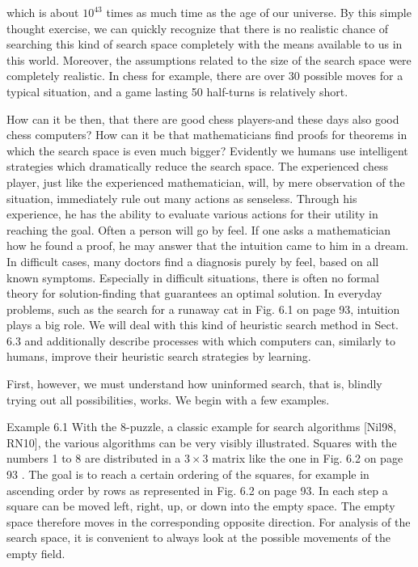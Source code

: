 \documentclass[10pt]{article}
\begin{document}
which is about $10^{43}$ times as much time as the age of our universe. By this simple thought exercise, we can quickly recognize that there is no realistic chance of searching this kind of search space completely with the means available to us in this world. Moreover, the assumptions related to the size of the search space were completely realistic. In chess for example, there are over 30 possible moves for a typical situation, and a game lasting 50 half-turns is relatively short.

How can it be then, that there are good chess players-and these days also good chess computers? How can it be that mathematicians find proofs for theorems in which the search space is even much bigger? Evidently we humans use intelligent strategies which dramatically reduce the search space. The experienced chess player, just like the experienced mathematician, will, by mere observation of the situation, immediately rule out many actions as senseless. Through his experience, he has the ability to evaluate various actions for their utility in reaching the goal. Often a person will go by feel. If one asks a mathematician how he found a proof, he may answer that the intuition came to him in a dream. In difficult cases, many doctors find a diagnosis purely by feel, based on all known symptoms. Especially in difficult situations, there is often no formal theory for solution-finding that guarantees an optimal solution. In everyday problems, such as the search for a runaway cat in Fig. 6.1 on page 93, intuition plays a big role. We will deal with this kind of heuristic search method in Sect. 6.3 and additionally describe processes with which computers can, similarly to humans, improve their heuristic search strategies by learning.

First, however, we must understand how uninformed search, that is, blindly trying out all possibilities, works. We begin with a few examples.

Example 6.1 With the 8-puzzle, a classic example for search algorithms [Nil98, RN10], the various algorithms can be very visibly illustrated. Squares with the numbers 1 to 8 are distributed in a $3 \times 3$ matrix like the one in Fig. 6.2 on page 93 . The goal is to reach a certain ordering of the squares, for example in ascending order by rows as represented in Fig. 6.2 on page 93. In each step a square can be moved left, right, up, or down into the empty space. The empty space therefore moves in the corresponding opposite direction. For analysis of the search space, it is convenient to always look at the possible movements of the empty field.
\end{document}
